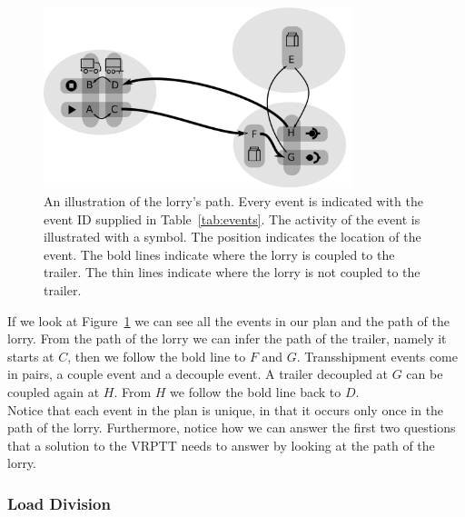 \begin{figure}[!h]
  \centering
    \includegraphics[width=0.8\textwidth]{img/trivial_vertices_v2.pdf}
  \caption{An illustration of the lorry's path. Every event is indicated with the event ID supplied in Table~\ref{tab:events}. The activity of the event is illustrated with a symbol. The position indicates the location of the event. The bold lines indicate where the lorry is coupled to the trailer. The thin lines indicate where the lorry is not coupled to the trailer.}
  \label{fig:vertices}
\end{figure}



If we look at Figure~\ref{fig:vertices} we can see all the events in our plan and the path of the lorry.
From the path of the lorry we can infer the path of the trailer, namely it starts at $C$, then we follow the bold line to $ F $ and $ G$. Transshipment events come in pairs, a couple event and a decouple event. A trailer decoupled at $G$ can be coupled again at $H$.
 From $H$ we follow the bold line back to $D$. \\

Notice that each event in the plan is unique, in that it occurs only once in the path of the lorry.
Furthermore, notice how we can answer the first two questions that a solution to the VRPTT needs to answer by looking at the path of the lorry.


\subsubsection{Load Division}


